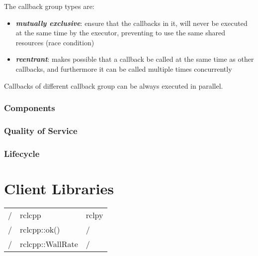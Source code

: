   The callback group types are:
  \begin{itemize}
    \item \textbf{\textit{mutually exclusive}}: ensure that the callbacks in it, will never be executed at the same time by the executor, preventing to use the same shared resources (race condition)
    \item \textbf{\textit{reentrant}}: makes possible that a callback be called at the same time as other callbacks, and furthermore it can be called multiple times concurrently
  \end{itemize}

  Callbacks of different callback group can be always executed in parallel.




\section*{Components}



\section*{Quality of Service}



\section*{Lifecycle}





\part{Client Libraries}



  \begin{tabularx}{\linewidth}{| l | l | l |}
    / & rclcpp & rclpy \\
    / & rclcpp::ok() & / \\
    / & rclcpp::WallRate & / \\
  \end{tabularx}




  